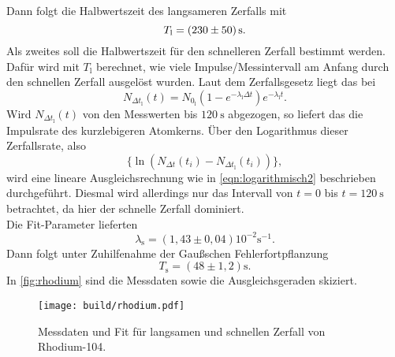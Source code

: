 \noindent Dann folgt die Halbwertszeit des langsameren Zerfalls mit
\begin{equation}
	T_\text{l} = \SI{230\pm50}{\second}.
\end{equation}
\noindent
Als zweites soll die Halbwertszeit für den schnelleren Zerfall bestimmt werden. Dafür wird mit
$T_\text{l}$ berechnet, wie viele Impulse/Messintervall am Anfang durch den schnellen Zerfall ausgelöst wurden.
Laut dem Zerfallsgesetz liegt das bei
\begin{equation}
	N_{\Delta t_\text{l}} (t) = N_{0_\text{l}} \left(1 - e^{-\lambda_\text{l}\Delta t}\right) 
	e^{-\lambda_\text{l}t }.
\end{equation}
\noindent
Wird $N_{\Delta t_\text{l}}(t)$ von den Messwerten bis $\SI{120}{\second}$ abgezogen, so liefert das
die Impulsrate des kurzlebigeren Atomkerns. Über den Logarithmus dieser Zerfallsrate, also
\begin{equation}
	\{ \ln(N_{\Delta t}(t_i) - N_{\Delta t_\text{l}} (t_i)) \},
\end{equation}
wird eine lineare Ausgleichsrechnung wie in \autoref{eqn:logarithmisch2} beschrieben durchgeführt. Diesmal
wird allerdings nur das Intervall von $t=0$ bis $t=\SI{120}{\second}$ betrachtet, da hier der schnelle 
Zerfall dominiert.
\\
Die Fit-Parameter lieferten
\begin{equation}
	\lambda_\text{s} = (1,43 \pm 0,04) 10^{-2} \si{\second}^{-1}.
\end{equation}
Dann folgt unter Zuhilfenahme der Gaußschen Fehlerfortpflanzung
\begin{equation}
	T_\text{s} = (48\pm1,2)\si{\second}.
\end{equation}
\noindent
In \autoref{fig:rhodium} sind die Messdaten sowie die Ausgleichsgeraden skiziert.
\begin{figure}[H]
	\centering
	\texttt{[image: build/rhodium.pdf]}
	\caption{Messdaten und Fit für langsamen und schnellen Zerfall von Rhodium-104.}
	\label{fig:rhodium}
\end{figure}
